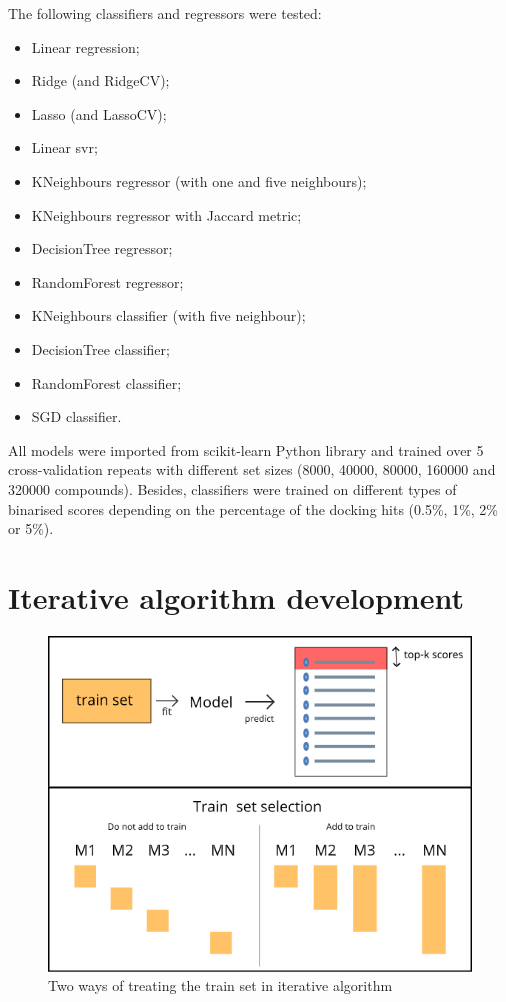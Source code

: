 The following classifiers and regressors were tested:
\begin{itemize}
    \item Linear regression;
    \item Ridge (and RidgeCV);
    \item Lasso (and LassoCV);
    \item Linear \acrshort{svr};
    \item KNeighbours regressor (with one and five neighbours);
    \item KNeighbours regressor with Jaccard metric;
    \item DecisionTree regressor;
    \item RandomForest regressor;
    \item KNeighbours classifier (with five neighbour);
    \item DecisionTree classifier;
    \item RandomForest classifier;
    \item SGD classifier.
\end{itemize}

All models were imported from scikit-learn Python library and trained over 5 cross-validation repeats with different set sizes (8000, 40000, 80000, 160000 and 320000 compounds).
Besides, classifiers were trained on different types of binarised scores depending on the percentage of the docking hits (0.5\%, 1\%, 2\% or 5\%).


\section{Iterative algorithm development}

\begin{figure}
    \centering
    \includegraphics[scale=0.72]{Images/image1.png}
    \caption{Two ways of treating the train set in iterative algorithm}
    \label{TrainSetSelection}
\end{figure}

